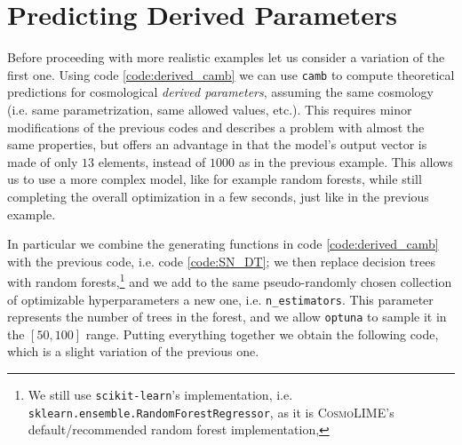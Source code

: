 \section{Predicting Derived Parameters}\label{sec:predicting_derived_parameters}


Before proceeding with more realistic examples let us consider a variation of the first one. Using code \ref{code:derived_camb} we can use \texttt{camb} to compute theoretical predictions for cosmological \emph{derived parameters}, assuming the same cosmology (i.e. same parametrization, same allowed values, etc.). This requires minor modifications of the previous codes and describes a problem with almost the same properties, but offers an advantage in that the model's output vector is made of only $13$ elements, instead of $1000$ as in the previous example. This allows us to use a more complex model, like for example random forests, while still completing the overall optimization in a few seconds, just like in the previous example.

In particular we combine the generating functions in code \ref{code:derived_camb} with the previous code, i.e. code \ref{code:SN_DT}; we then replace decision trees with random forests,\footnote{We still use \texttt{scikit-learn}'s implementation, i.e. \texttt{sklearn.ensemble.RandomForestRegressor}, as it is \textsc{CosmoLIME}'s default/recommended random forest implementation,} and we add to the same pseudo-randomly chosen collection of optimizable hyperparameters a new one, i.e. \texttt{n\_estimators}. This parameter represents the number of trees in the forest, and we allow \texttt{optuna} to sample it in the $[50, 100]$ range.
Putting everything together we obtain the following code, which is a slight variation of the previous one.


